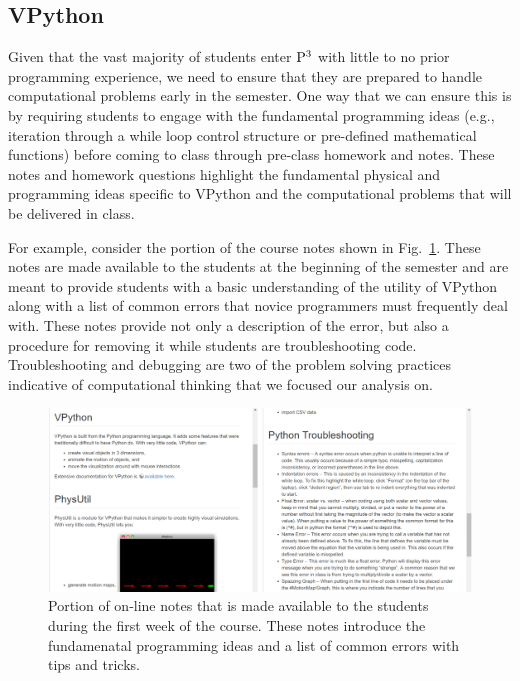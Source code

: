 \documentclass{msuphddissertation}
\begin{document}
\begin{doublespace}
\section{VPython}

Given that the vast majority of students enter ${\rm P}^{3}$ with little to no prior programming experience, we need to ensure that they are prepared to handle computational problems early in the semester.  One way that we can ensure this is by requiring students to engage with the fundamental programming ideas (e.g., iteration through a while loop control structure or pre-defined mathematical functions) before coming to class through pre-class homework and notes.  These notes and homework questions highlight the fundamental physical and programming ideas specific to VPython and the computational problems that will be delivered in class.

For example, consider the portion of the course notes shown in Fig.~\ref{CH3:VPythonNotes}.  These notes are made available to the students at the beginning of the semester and are meant to provide students with a basic understanding of the utility of VPython along with a list of common errors that novice programmers must frequently deal with.  These notes provide not only a description of the error, but also a procedure for removing it while students are troubleshooting code.  Troubleshooting and debugging are two of the problem solving practices indicative of computational thinking that we focused our analysis on.

\begin{figure}[ht]\centering
\includegraphics[width=\textwidth]{images/CH3VPythonNotes.pdf}
\caption{Portion of on-line notes that is made available to the students during the first week of the course.  These notes introduce the fundamenatal programming ideas and a list of common errors with tips and tricks.}\label{CH3:VPythonNotes}
\end{figure} 


\end{doublespace}
\end{document}
